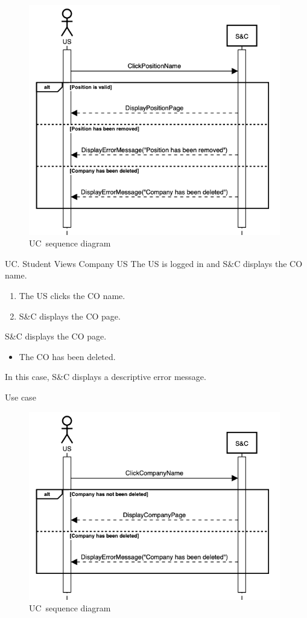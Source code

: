 \begin{figure}[h]
    \centering
    \includegraphics[width=11cm]{images/sequence-diagrams/student-views-position.png}
    \caption{UC\theuc\ sequence diagram}
\end{figure}


\clearpage
\begin{usecase}
    {UC\theuc. Student Views Company}
    {US}
    {The US is logged in and S\&C displays the CO name.}
    {\begin{enumerate}[leftmargin=*]
        \item The US clicks the CO name.
        \item S\&C displays the CO page.
    \end{enumerate}}
    {S\&C displays the CO page.}
    {\begin{itemize}[leftmargin=*, label=\tiny\textbullet]
        \item The CO has been deleted.
    \end{itemize}
    In this case, S\&C displays a descriptive error message.}
    {Use case \theuc}
\end{usecase}

\begin{figure}[h]
    \centering
    \includegraphics[width=11cm]{images/sequence-diagrams/student-views-company.png}
    \caption{UC\theuc\ sequence diagram}
\end{figure}

